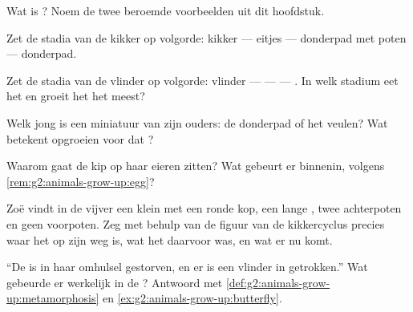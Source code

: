 \begin{exercise}[$\star$]\label{exo:g2:animals-grow-up:4}
Wat is ? Noem de twee beroemde voorbeelden uit dit
hoofdstuk.
\end{exercise}

\begin{exercise}[$\star$]\label{exo:g2:animals-grow-up:5}
Zet de stadia van de kikker op volgorde: kikker --- eitjes ---
donderpad met poten --- donderpad.
\end{exercise}

\begin{exercise}[$\star$]\label{exo:g2:animals-grow-up:6}
Zet de stadia van de vlinder op volgorde: vlinder ---  ---  ---
. In welk stadium eet het   en groeit het het meest?
\end{exercise}

\begin{exercise}[$\star$]\label{exo:g2:animals-grow-up:7}
Welk jong  is een miniatuur van zijn ouders: de donderpad of het
veulen? Wat betekent opgroeien voor dat ?
\end{exercise}

\begin{exercise}[$\star$]\label{exo:g2:animals-grow-up:8}
Waarom gaat de kip op haar eieren zitten? Wat gebeurt er binnenin,
volgens \cref{rem:g2:animals-grow-up:egg}?
\end{exercise}

\begin{exercise}[$\star\star$]\label{exo:g2:animals-grow-up:9}
Zoë vindt in de vijver een klein  met een ronde kop, een lange
, twee achterpoten en geen voorpoten. Zeg met behulp van de
figuur van de kikkercyclus precies waar het op zijn weg is, wat het
daarvoor was, en wat er nu komt.
\end{exercise}

\begin{exercise}[$\star\star$]\label{exo:g2:animals-grow-up:10}
``De  is in haar omhulsel gestorven, en er is een vlinder in
getrokken.'' Wat gebeurde er werkelijk in de ? Antwoord met
\cref{def:g2:animals-grow-up:metamorphosis} en
\cref{ex:g2:animals-grow-up:butterfly}.
\end{exercise}
